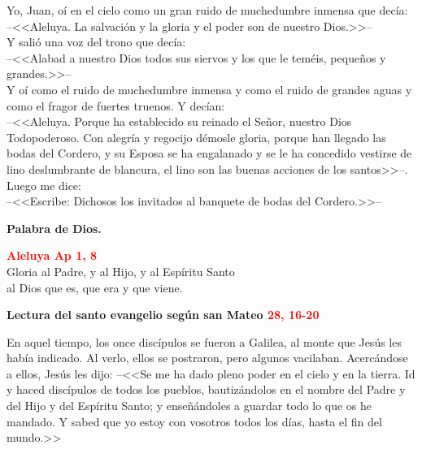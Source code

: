 \documentclass[12pt, letterpaper, spanish]{report}
\begin{document}
\Large Yo, Juan, o\'i en el cielo como un gran ruido de muchedumbre inmensa que dec\'ia: \\
--<<Aleluya. La salvaci\'on y la gloria y el poder son de nuestro Dios.>>-- \\
Y sali\'o una voz del trono que dec\'ia: \\
--<<Alabad a nuestro Dios todos sus siervos y los que le tem\'eis, peque\~nos y grandes.>>-- \\
Y o\'i como el ruido de muchedumbre inmensa y como el ruido de grandes aguas y 
como el fragor de fuertes truenos. Y dec\'ian: \\
--<<Aleluya. Porque ha establecido su reinado el Se\~nor, nuestro Dios \\ Todopoderoso. 
Con alegr\'ia y regocijo d\'emosle gloria, porque han llegado las bodas del Cordero, 
y su Esposa se ha engalanado y se le ha concedido vestirse de lino deslumbrante de blancura, el 
lino son las buenas acciones de los santos>>--. \\
Luego me dice: \\
--<<Escribe: Dichosos los invitados al banquete de bodas del Cordero.>>-- \newline

{\bfseries Palabra de Dios.} \newline

\begin{center} 
\Large {\bfseries \textcolor{red}{Aleluya \hspace{1cm} Ap 1, 8}} \\
Gloria al Padre, y al Hijo, y al Esp\'iritu Santo \\
al Dios que es, que era y que viene.
\end{center}

\newpage

\Huge \textcolor{red}{} \Large {\bfseries Lectura del santo evangelio seg\'un san Mateo \hspace{1cm} \textcolor{red}{28, 16-20}} \newline

\Large En aquel tiempo, los once disc\'ipulos se fueron a Galilea, al monte que Jes\'us les 
hab\'ia indicado. \hfill \break
Al verlo, ellos se postraron, pero algunos vacilaban. \newline
Acerc\'andose a ellos, Jes\'us les dijo: \newline
--<<Se me ha dado pleno poder en el cielo y en la tierra. \newline
Id y haced disc\'ipulos de todos los pueblos, bautiz\'andolos en el nombre del Padre y del Hijo y 
del Esp\'iritu Santo; y ense\~n\'andoles a guardar todo lo que os he mandado. \newline
Y sabed que yo estoy con vosotros todos los d\'ias, hasta el fin del mundo.>> \newline
\end{document}
